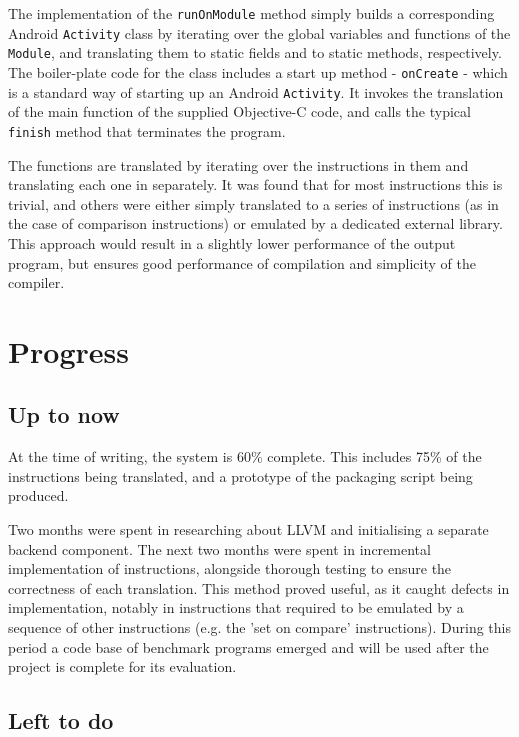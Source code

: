 \documentclass[parskip]{cs4rep}
\begin{document}
The implementation of the {\tt runOnModule} method simply builds a corresponding Android {\tt Activity} class by iterating over the global variables and functions of the {\tt Module}, and translating them to static fields and to static methods, respectively. The boiler-plate code for the class includes a start up method - {\tt onCreate} - which is a standard way of starting up an Android {\tt Activity}. It invokes the translation of the main function of the supplied Objective-C code, and calls the typical {\tt finish} method that terminates the program.

The functions are translated by iterating over the instructions in them and translating each one in separately. It was found that for most instructions this is trivial, and others were either simply translated to a series of instructions (as in the case of comparison instructions) or emulated by a dedicated external library. This approach would result in a slightly lower performance of the output program, but ensures good performance of compilation and simplicity of the compiler.

\chapter{Progress}

\section{Up to now}

At the time of writing, the system is 60\% complete. This includes 75\% of the instructions being translated, and a prototype of the packaging script being produced.

Two months were spent in researching about LLVM and initialising a separate backend component. The next two months were spent in incremental implementation of instructions, alongside thorough testing to ensure the correctness of each translation. This method proved useful, as it caught defects in implementation, notably in instructions that required to be emulated by a sequence of other instructions (e.g. the 'set on compare' instructions). During this period a code base of benchmark programs emerged and will be used after the project is complete for its evaluation.

\section{Left to do}
\end{document}

